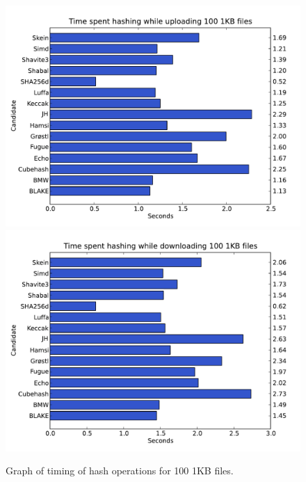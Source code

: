 \documentclass[english,12pt,a4paper]{book}
\begin{document}
\begin{figure}[h!]
    \centering
    \includegraphics[width=0.9\columnwidth]
        {graphs/Timespenthashingwhileuploading1001KBfiles.pdf}
    \includegraphics[width=0.9\columnwidth]
        {graphs/Timespenthashingwhiledownloading1001KBfiles.pdf}
    \caption{Graph of timing of hash operations for 100 1KB files.}
    \label{fig:graph:1001kb}
\end{figure}
\end{document}
